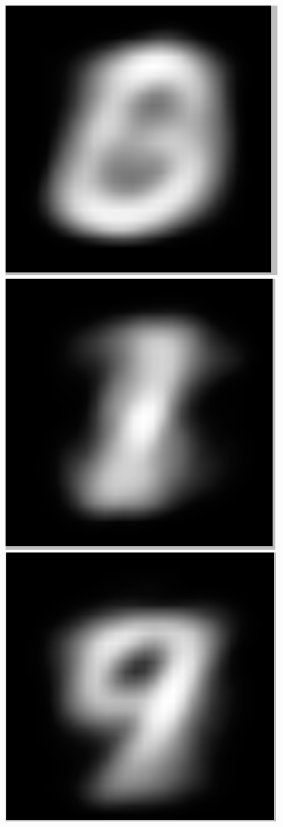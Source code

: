 \documentclass[submit]{harvardml}
\begin{document}
	\begin{figure}[h]
		\includegraphics[scale=0.1]{./m4/0}
		\includegraphics[scale=0.1]{./m4/1}
		\includegraphics[scale=0.1]{./m4/2}
	\end{figure}
\end{document}
